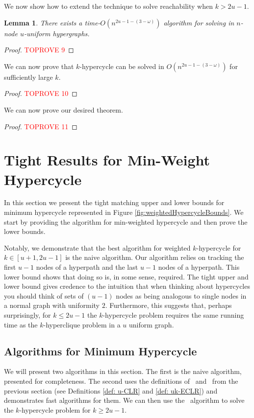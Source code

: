 \documentclass[11pt,letterpaper,pdftex]{article}
\newtheorem{lemma}[theorem]{Lemma}
\newcounter{definition}
\begin{document}
We now show how to extend the technique to solve reachability when $k>2u-1$.

\begin{lemma} \label{lem: uCLR algorithm}
    There exists a time-$O(n^{2u-1-(3-\omega)})$ algorithm for solving  in $n$-node $u$-uniform hypergraphs.
\end{lemma}
\begin{proof}\textcolor{red}{TOPROVE 9}\end{proof}

We can now prove that $k$-hypercycle can be solved in $O(n^{2u-1-(3-\omega)})$ for sufficiently large $k$.

\matMulReach*

\begin{proof}\textcolor{red}{TOPROVE 10}\end{proof}

We can now prove our desired theorem. 


\fastCycleDetect*

\begin{proof}\textcolor{red}{TOPROVE 11}\end{proof}


 
\section{Tight Results for Min-Weight Hypercycle}
\label{sec:tight_weighted}
In this section we present the tight matching upper and lower bounds for minimum hypercycle represented in Figure \ref{fig:weightedHypercycleBounds}. We start by providing the algorithm for min-weighted hypercycle and then prove the lower bounds.

Notably, we demonstrate that the best algorithm for weighted $k$-hypercycle for $k \in [u+1, 2u-1]$ is the naive algorithm. Our algorithm relies on tracking the first $u-1$ nodes of a hyperpath and the last $u-1$ nodes of a hyperpath.  This lower bound shows that doing so is, in some sense, required. The tight upper and lower bound gives credence to the intuition that when thinking about hypercycles you should think of sets of $(u-1)$ nodes as being analogous to single nodes in a normal graph with uniformity $2$. Furthermore, this suggests that, perhaps surprisingly, for $k\leq 2u-1$ the $k$-hypercycle problem requires the same running time as the  $k$-hyperclique problem in a $u$ uniform graph. 

\subsection{Algorithms for Minimum Hypercycle}
We will present two algorithms in this section. The first is the naive algorithm, presented for completeness. The second uses the definitions of 
\uCLR~and ~from the previous section (see Definitions \ref{def: u-CLR} and \ref{def: uk-ECLR}) and demonstrates fast algorithms for them. We can then use the ~algorithm to solve the $k$-hypercycle problem for $k\geq 2u-1$.
\end{document}
